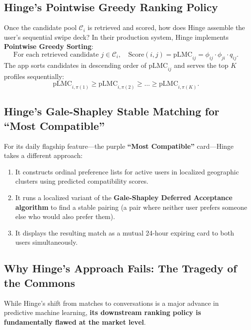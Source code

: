 \documentclass[11pt,letterpaper]{article}
\theoremstyle{definition}
\theoremstyle{plain}
\theoremstyle{remark}
\begin{document}
\subsection{Hinge's Pointwise Greedy Ranking Policy}
Once the candidate pool $\mathcal{C}_i$ is retrieved and scored, how does Hinge assemble the user's sequential swipe deck?
In their production system, Hinge implements \textbf{Pointwise Greedy Sorting}:
\[
    \text{For each retrieved candidate } j \in \mathcal{C}_i, \quad \text{Score}(i, j) = \mathrm{pLMC}_{ij} = \phi_{ij} \cdot \phi_{ji} \cdot q_{ij}.
\]
The app sorts candidates in descending order of $\mathrm{pLMC}_{ij}$ and serves the top $K$ profiles sequentially:
\[
    \mathrm{pLMC}_{i, \pi(1)} \ge \mathrm{pLMC}_{i, \pi(2)} \ge \dots \ge \mathrm{pLMC}_{i, \pi(K)}.
\]

\subsection{Hinge's Gale-Shapley Stable Matching for ``Most Compatible''}
For its daily flagship feature---the purple \textbf{``Most Compatible''} card---Hinge takes a different approach:
\begin{enumerate}[leftmargin=2em]
    \item It constructs ordinal preference lists for active users in localized geographic clusters using predicted compatibility scores.
    \item It runs a localized variant of the \textbf{Gale-Shapley Deferred Acceptance algorithm} to find a stable pairing (a pair where neither user prefers someone else who would also prefer them).
    \item It displays the resulting match as a mutual 24-hour expiring card to both users simultaneously.
\end{enumerate}

\subsection{Why Hinge's Approach Fails: The Tragedy of the Commons}
While Hinge's shift from matches to conversations is a major advance in predictive machine learning, \textbf{its downstream ranking policy is fundamentally flawed at the market level}.
\end{document}
